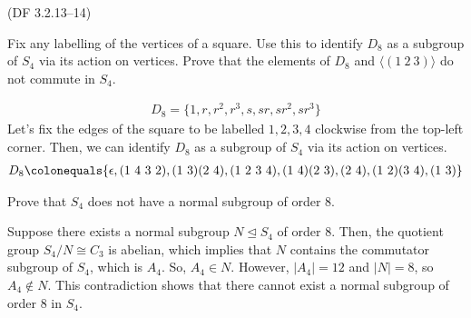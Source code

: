 \begin{problem}{(\textsf{DF 3.2.13--14})}
  \begin{enumalph}
  \item Fix any labelling of the vertices of a square.
    Use this to identify $D_8$ as a subgroup of $S_4$
    via its action on vertices.
    Prove that the elements of $D_8$ 
    and $\langle (1\ 2\ 3) \rangle$ do not commute in $S_4$.
    \begin{Answer}
      \begin{align*}
        D_8 = \{ 1, r, r^2, r^3, s, sr, sr^2, sr^3 \}
      \end{align*}
      Let's fix the edges of the square to be labelled $1,2,3,4$
      clockwise from the top-left corner.
      Then, we can identify $D_8$ as a subgroup of $S_4$ via its action on vertices.
      \begin{align*}
        D_8 &\colonequals \{ \epsilon, (1\ 4\ 3\ 2), (1\ 3)(2\ 4), (1\ 2\ 3\ 4),
                            (1\ 4)(2\ 3), (2\ 4), (1\ 2)(3\ 4), (1\ 3) \} \\
      \end{align*}
    \end{Answer}
  \item Prove that $S_4$ does not have a normal subgroup of order $8$.
  \begin{Answer}
    Suppose there exists a normal subgroup $N \trianglelefteq S_4$ of order $8$.
    Then, the quotient group $S_4/N \cong C_3$ is abelian, which implies
    that $N$ contains
    the commutator subgroup of $S_4$, which is $A_4$.
    So, $A_4 \in N$.
    However, $|A_4| = 12$ and $|N| = 8$, so $A_4 \not \in N$.
    This contradiction shows that there cannot exist a normal subgroup of order $8$ in $S_4$.
    
  \end{Answer}
  \end{enumalph}
\end{problem}
